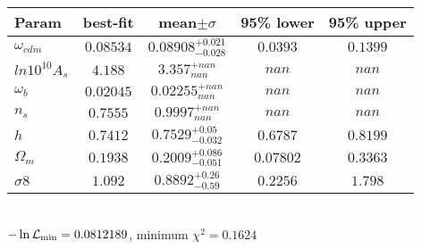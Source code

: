 \begin{tabular}{|l|c|c|c|c|} 
 \hline 
Param & best-fit & mean$\pm\sigma$ & 95\% lower & 95\% upper \\ \hline 
$\omega_{cdm }$ &$0.08534$ & $0.08908_{-0.028}^{+0.021}$ & $0.0393$ & $0.1399$ \\ 
$ln10^{10}A_{s }$ &$4.188$ & $3.357_{nan}^{+nan}$ & $nan$ & $nan$ \\ 
$\omega_{b }$ &$0.02045$ & $0.02255_{nan}^{+nan}$ & $nan$ & $nan$ \\ 
$n_{s }$ &$0.7555$ & $0.9997_{nan}^{+nan}$ & $nan$ & $nan$ \\ 
$h$ &$0.7412$ & $0.7529_{-0.032}^{+0.05}$ & $0.6787$ & $0.8199$ \\ 
$\Omega_{m }$ &$0.1938$ & $0.2009_{-0.051}^{+0.086}$ & $0.07802$ & $0.3363$ \\ 
$\sigma8$ &$1.092$ & $0.8892_{-0.59}^{+0.26}$ & $0.2256$ & $1.798$ \\ 
\hline 
 \end{tabular} \\ 
$-\ln{\cal L}_\mathrm{min} =0.0812189$, minimum $\chi^2=0.1624$ \\ 
